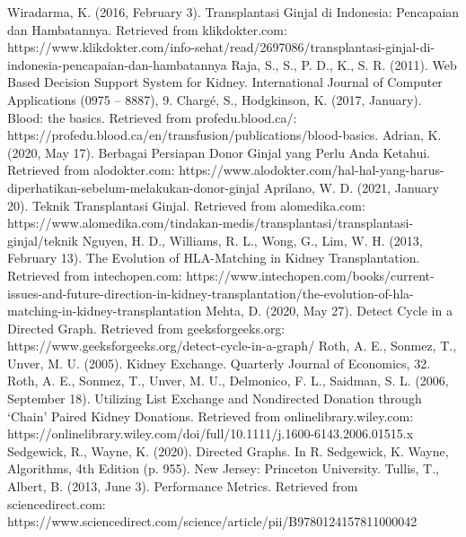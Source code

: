 \documentclass[conference]{IEEEtran}
\begin{document}
\begin{thebibliography}{00}
 Wiradarma, K. (2016, February 3). Transplantasi Ginjal di Indonesia: Pencapaian dan Hambatannya. Retrieved from klikdokter.com: https://www.klikdokter.com/info-sehat/read/2697086/transplantasi-ginjal-di-indonesia-pencapaian-dan-hambatannya
 Raja, S., S., P. D., K., S. R. (2011). Web Based Decision Support System for Kidney. International Journal of Computer Applications (0975 – 8887), 9.
 Chargé, S., Hodgkinson, K. (2017, January). Blood: the basics. Retrieved from profedu.blood.ca/: https://profedu.blood.ca/en/transfusion/publications/blood-basics.
 Adrian, K. (2020, May 17). Berbagai Persiapan Donor Ginjal yang Perlu Anda Ketahui. Retrieved from alodokter.com: https://www.alodokter.com/hal-hal-yang-harus-diperhatikan-sebelum-melakukan-donor-ginjal
 Aprilano, W. D. (2021, January 20). Teknik Transplantasi Ginjal. Retrieved from alomedika.com: https://www.alomedika.com/tindakan-medis/transplantasi/transplantasi-ginjal/teknik
 Nguyen, H. D., Williams, R. L., Wong, G., Lim, W. H. (2013, February 13). The Evolution of HLA-Matching in Kidney Transplantation. Retrieved from intechopen.com: https://www.intechopen.com/books/current-issues-and-future-direction-in-kidney-transplantation/the-evolution-of-hla-matching-in-kidney-transplantation
 Mehta, D. (2020, May 27). Detect Cycle in a Directed Graph. Retrieved from geeksforgeeks.org: https://www.geeksforgeeks.org/detect-cycle-in-a-graph/
 Roth, A. E., Sonmez, T., Unver, M. U. (2005). Kidney Exchange. Quarterly Journal of Economics, 32.
 Roth, A. E., Sonmez, T., Unver, M. U., Delmonico, F. L., Saidman, S. L. (2006, September 18). Utilizing List Exchange and Nondirected Donation through ‘Chain’ Paired Kidney Donations. Retrieved from onlinelibrary.wiley.com: https://onlinelibrary.wiley.com/doi/full/10.1111/j.1600-6143.2006.01515.x
 Sedgewick, R., Wayne, K. (2020). Directed Graphs. In R. Sedgewick, K. Wayne, Algorithms, 4th Edition (p. 955). New Jersey: Princeton University.
 Tullis, T., Albert, B. (2013, June 3). Performance Metrics. Retrieved from sciencedirect.com: https://www.sciencedirect.com/science/article/pii/B9780124157811000042
\end{thebibliography}
\end{document}
